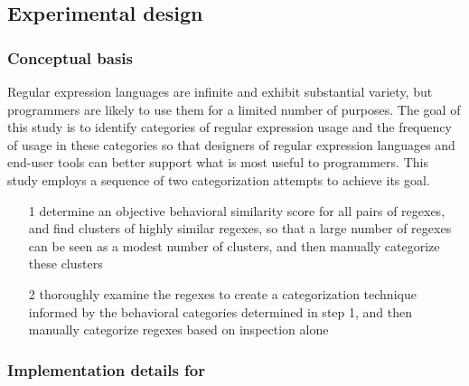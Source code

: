 \subsection{Experimental design}

\subsubsection{Conceptual basis}
Regular expression languages are infinite and exhibit substantial variety, but programmers are likely to use them for a limited number of purposes.  The goal of this study is to identify categories of regular expression usage and the frequency of usage in these categories so that designers of regular expression languages and end-user tools can better support what is most useful to programmers.  This study employs a sequence of two categorization attempts to achieve its goal.
\begin{itemize}\itemsep -1pt
\item[1] determine an objective behavioral similarity score for all pairs of regexes, and find clusters of highly similar regexes, so that a large number of regexes can be seen as a modest number of clusters, and then manually categorize these clusters
\item[2] thoroughly examine the regexes to create a categorization technique informed by the behavioral categories determined in step 1, and then manually categorize regexes based on inspection alone
\end{itemize}

\subsubsection{Implementation details for }
